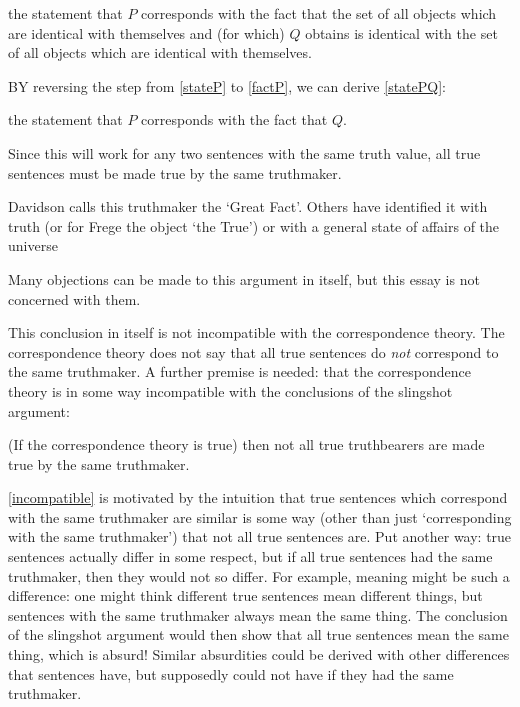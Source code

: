 	\begin{example} \label{factQ}
	the statement that $P$ corresponds with the fact that the set of all objects which are identical with themselves and (for which) $Q$ obtains is identical with the set of all objects which are identical with themselves.
	\end{example}

BY reversing the step from \ref{stateP} to \ref{factP}, we can derive \ref{statePQ}:

	\begin{example} \label{statePQ}
	the statement that $P$ corresponds with the fact that $Q$.
	\end{example}

Since this will work for any two sentences with the same truth value, all true sentences must be made true by the same truthmaker.

Davidson calls this truthmaker the `Great Fact'.
\parencite[753]{Davidson_1969}
Others have identified it with truth (or for Frege the object `the True'\parencite[216]{Frege_1948}) or with a general state of affairs of the universe %

Many objections can be made to this argument in itself, but this essay is not concerned with them.

This conclusion in itself is not incompatible with the correspondence theory.
The correspondence theory does not say that all true sentences do \emph{not} correspond to the same truthmaker.
A further premise is needed: that the correspondence theory is in some way incompatible with the conclusions of the slingshot argument:

	\begin{thesis} \label{incompatible}
	(If the correspondence theory is true) then not all true truthbearers are made true by the same truthmaker.
	\end{thesis}

\ref{incompatible} is motivated by the intuition that true sentences which correspond with the same truthmaker are similar is some way (other than just `corresponding with the same truthmaker') that not all true sentences are.
Put another way: true sentences actually differ in some respect, but if all true sentences had the same truthmaker, then they would not so differ.
For example, meaning might be such a difference: one might think different true sentences mean different things, but sentences with the same truthmaker always mean the same thing.
The conclusion of the slingshot argument would then show that all true sentences mean the same thing, which is absurd!
Similar absurdities could be derived with other differences that sentences have, but supposedly could not have if they had the same truthmaker.

